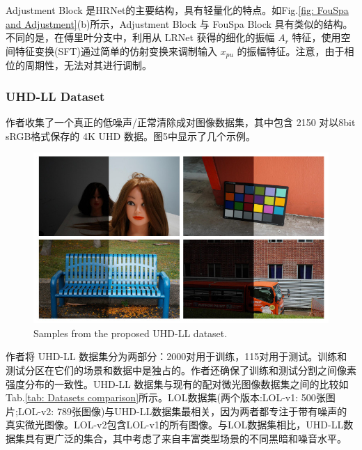 \documentclass[letterpaper,10pt]{article}
\begin{document}
	Adjustment Block 是HRNet的主要结构，具有轻量化的特点。如Fig.\ref{fig: FouSpa and Adjustment}(b)所示，Adjustment Block 与 FouSpa Block 具有类似的结构。不同的是，在傅里叶分支中，利用从 LRNet 获得的细化的振幅 $A_r$ 特征，使用空间特征变换(SFT)通过简单的仿射变换来调制输入 $x_{pu}$ 的振幅特征。注意，由于相位的周期性，无法对其进行调制。
	
	\subsubsection{UHD-LL Dataset}
	
	作者收集了一个真正的低噪声/正常清除成对图像数据集，其中包含 2150 对以8bit sRGB格式保存的 4K UHD 数据。图5中显示了几个示例。

	\begin{figure}[htbp]
		\centering 
		\includegraphics[width=0.5\columnwidth]{picture/Dataset}
		\caption{
			\label{fig: UHD-LL} Samples from the proposed UHD-LL
			dataset.
		}
	\end{figure}
	
	作者将 UHD-LL 数据集分为两部分：2000对用于训练，115对用于测试。训练和测试分区在它们的场景和数据中是独占的。作者还确保了训练和测试分割之间像素强度分布的一致性。UHD-LL 数据集与现有的配对微光图像数据集之间的比较如Tab.\ref{tab: Datasets comparison}所示。LOL数据集(两个版本:LOL-v1: 500张图片;LOL-v2: 789张图像)与UHD-LL数据集最相关，因为两者都专注于带有噪声的真实微光图像。LOL-v2包含LOL-v1的所有图像。与LOL数据集相比，UHD-LL数据集具有更广泛的集合，其中考虑了来自丰富类型场景的不同黑暗和噪音水平。
	
\end{document}
